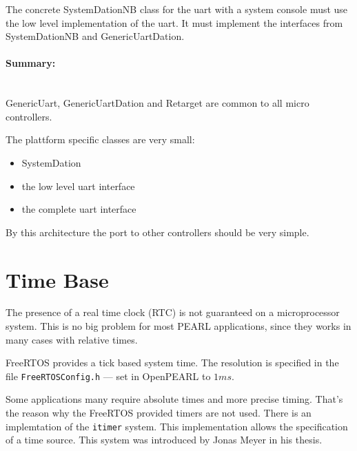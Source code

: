 The concrete SystemDationNB class for the uart with a system console
must use the low level implementation  of the uart. It must implement
the interfaces from SystemDationNB and GenericUartDation. 

\paragraph{Summary:}\ \\
GenericUart, GenericUartDation and Retarget are common to all micro
 controllers.

The plattform specific classes are very small:

\begin{itemize}
\item SystemDation
\item the low level uart interface
\item the complete uart interface
\end{itemize}

By this architecture the port to other controllers should be very simple.

\section{Time Base}

The presence of a real time clock (RTC) is not guaranteed on a
microprocessor system.
This is no big problem for most PEARL applications, since they works 
in many cases with relative times.

FreeRTOS provides a tick based system time. The resolution is specified
in the file \texttt{FreeRTOSConfig.h} --- 
set in OpenPEARL to $1 ms$.

Some applications many require absolute times and more precise timing.
That's the reason why the FreeRTOS provided timers are not used. 
There is an implemtation of the \texttt{itimer} system. This 
implementation allows the specification of a time source.
This system was introduced  by Jonas Meyer in his thesis.

